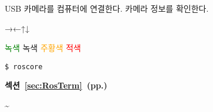 \setcounter{num}{0}

\vspace{\baselineskip}
\noindent
{}
\thenum


\setcounter{num}{0}
\vspace{\baselineskip}
\noindent
{}\circled{\thenum} USB 카메라를 컴퓨터에 연결한다.
\circled{\thenum} 카메라 정보를 확인한다.


→←↑↓

\textcolor{green}{녹색}
{\color{limegreen}녹색}
\textcolor{orange}{주황색}
\textcolor{red}{적색}


\vspace{\baselineskip}
\begin{lstlisting}[language=ROS]
$ roscore
\end{lstlisting}



\cite{book_key}

\textbf{섹션~\ref{sec:RosTerm}~(pp.\pageref{sec:RosTerm})}

\textasciitilde


